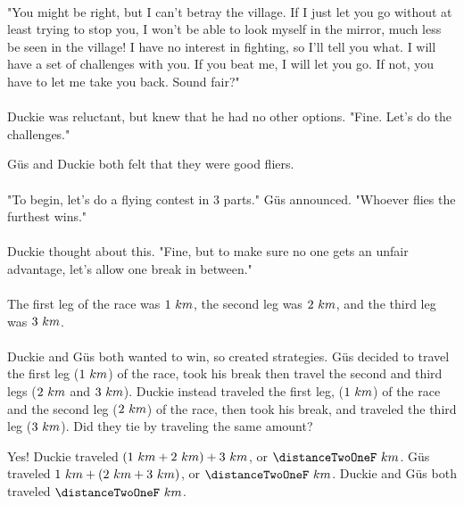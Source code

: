 \paragraph{} "You might be right, but I can't betray the village. If I just let you go without at least trying to stop you, I won't be able to look myself in the mirror, much less be seen in the village! I have no interest in fighting, so I'll tell you what. I will have a set of challenges with you. If you beat me, I will let you go. If not, you have to let me take you back. Sound fair?"
\paragraph{} Duckie was reluctant, but knew that he had no other options. "Fine. Let's do the challenges."
\vfill
\pagebreak
{}
{G{\"u}s and Duckie both felt that they were good fliers. 
\paragraph{} "To begin, let's do a flying contest in 3 parts." G{\"u}s announced. "Whoever flies the furthest wins."
\paragraph{} Duckie thought about this. "Fine, but to make sure no one gets an unfair advantage, let's allow one break in between."
\paragraph{} The first leg of the race was $1~km$, the second leg was $2~km$, and the third leg was $3~km$. 
\paragraph{} Duckie and G{\"u}s both wanted to win, so created strategies. G{\"u}s decided to travel the first leg ($1~km$) of the race, took his break then travel the second and third legs ($2~km$ and $3~km$). Duckie instead traveled the first leg, ($1~km$) of the race and the second leg ($2~km$) of the race, then took his break, and traveled the third leg ($3~km$). Did they tie by traveling the same amount?}
{Yes! Duckie traveled $(1~km + 2~km) + 3~km$, or $\distanceTwoOneF~km$. G{\"u}s traveled $1~km + (2~km + 3~km)$, or $\distanceTwoOneF~km$. Duckie and G{\"u}s both traveled $\distanceTwoOneF~km$.}
